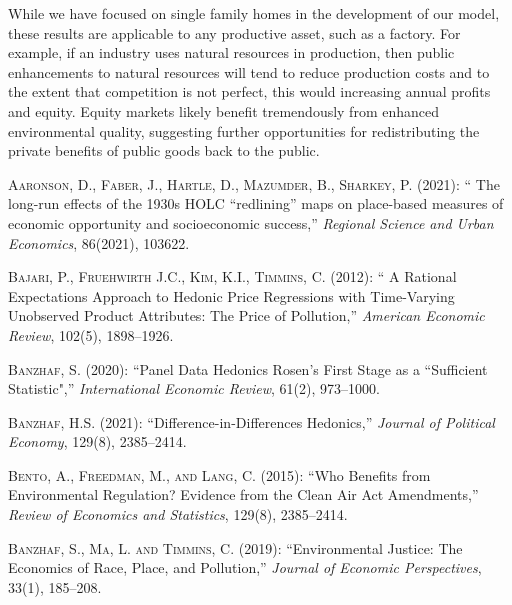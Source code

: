 \documentclass[ecta,nameyear,draft]{econsocart}
\theoremstyle{plain}
\theoremstyle{remark}
\begin{document}
While we have focused on single family homes in the development of our model, these results are applicable to any productive asset, such as a factory. For example, if an industry uses natural resources in production, then public enhancements to natural resources will tend to reduce production costs and to the extent that competition is not perfect, this would increasing annual profits and equity. Equity markets likely benefit tremendously from enhanced environmental quality, suggesting further opportunities for redistributing the private benefits of public goods back to the public.
 


\begin{thebibliography}{}

\textsc{Aaronson, D., Faber, J., Hartle, D., Mazumder, B., Sharkey, P.} (2021):
`` The long-run effects of the 1930s HOLC “redlining” maps on place-based
measures of economic opportunity and socioeconomic success,''
\textit{Regional Science and Urban Economics}, 86(2021), 103622.
\endbibitem

\textsc{Bajari, P., Fruehwirth J.C., Kim, K.I., Timmins, C.} (2012):
`` A Rational Expectations Approach to Hedonic Price Regressions with Time-Varying Unobserved Product Attributes: The Price of Pollution,''
\textit{American Economic Review}, 102(5), 1898--1926.
\endbibitem

\textsc{Banzhaf, S.} (2020):
``Panel Data Hedonics Rosen’s First Stage as a “Sufficient
Statistic",''
\textit{International Economic Review}, 61(2), 973--1000.
\endbibitem

\textsc{Banzhaf, H.S.} (2021):
``Difference-in-Differences Hedonics,''
\textit{Journal of Political Economy}, 129(8), 2385--2414.
\endbibitem


\textsc{Bento, A., Freedman, M., and Lang, C.} (2015):
``Who Benefits from Environmental Regulation? Evidence from the Clean Air Act Amendments,''
\textit{Review of Economics and Statistics}, 129(8), 2385--2414.
\endbibitem

\textsc{Banzhaf, S., Ma, L. and Timmins, C.} (2019):
``Environmental Justice: The Economics of Race, Place, and Pollution,''
\textit{Journal of Economic Perspectives}, 33(1), 185--208.
\endbibitem


\end{thebibliography}
\end{document}
